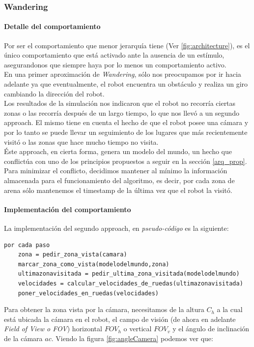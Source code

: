 \subsubsection{Wandering}
\label{wandering}

\paragraph{Detalle del comportamiento} 
Por ser el comportamiento que menor jerarqu\'ia tiene (Ver \ref{fig:architecture}), es el \'unico
comportamiento que est\'a activado ante la ausencia de un est\'imulo, asegurandonos que siempre
haya por lo menos un comportamiento activo.
\\
En una primer aproximaci\'on de \emph{Wandering}, s\'olo nos preocupamos por ir hacia adelante
ya que eventualmente, el robot encuentra un obst\'aculo y realiza un giro cambiando la direcci\'on
del robot.
\\
Los resultados de la simulaci\'on nos indicaron que el robot no recorr\'ia ciertas zonas o las recorr\'ia
despu\'es de un largo tiempo, lo que nos llev\'o a un segundo approach. El mismo tiene en cuenta el hecho
de que el robot posee una c\'amara y por lo tanto se puede llevar un seguimiento de los lugares que m\'as
recientemente visit\'o o las zonas que hace mucho tiempo no visita.
\\
\'Este approach, en cierta forma, genera un modelo del mundo, un hecho que conflict\'ua con uno de
los principios propuestos a seguir en la secci\'on \ref{arq_prop}. Para minimizar el conflicto, decidimos
mantener al m\'inimo la informaci\'on almacenada para el funcionamiento del algoritmo, es decir, por cada
zona de arena s\'olo mantenemos el timestamp de la \'ultima vez que el robot la visit\'o.

\paragraph{Implementaci\'on del comportamiento}

La implementaci\'on del segundo approach, en \emph{pseudo-c\'odigo} es la siguiente:
\begin{verbatim}
por cada paso
    zona = pedir_zona_vista(camara)
    marcar_zona_como_vista(modelodelmundo,zona)
    ultimazonavisitada = pedir_ultima_zona_visitada(modelodelmundo)
    velocidades = calcular_velocidades_de_ruedas(ultimazonavisitada)
    poner_velocidades_en_ruedas(velocidades)
\end{verbatim}
Para obtener la zona vista por la c\'amara, necesitamos de la altura $C_h$ a la cual est\'a ubicada
la c\'amara en el robot, el campo de visi\'on (de ahora en adelante \emph{Field of View o FOV})
horizontal $FOV_h$ o vertical $FOV_v$ y el \'angulo de inclinaci\'on de la c\'amara $ac$. Viendo la figura
\ref{fig:angleCamera} podemos ver que:

